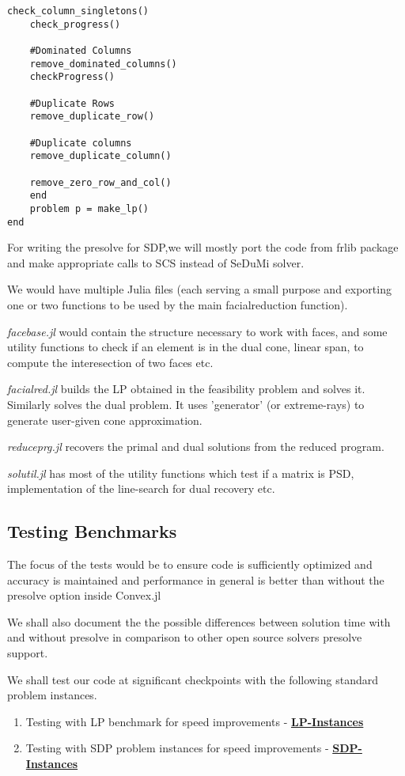 \documentclass[twoside]{article}
\begin{document}
\begin{multicols}{2}
\begin{Verbatim}[obeytabs]
	check_column_singletons()
	check_progress()

	#Dominated Columns
	remove_dominated_columns()
	checkProgress()

	#Duplicate Rows
	remove_duplicate_row()
	
	#Duplicate columns
	remove_duplicate_column()
	
	remove_zero_row_and_col()
	end
	problem p = make_lp()
end
\end{Verbatim}

For writing the presolve for SDP,we will mostly port the code from frlib package and make appropriate calls to SCS instead of SeDuMi solver.

We would have multiple Julia files (each serving a small purpose and exporting one or two functions to be used by the main facialreduction function).

\textit{facebase.jl} would contain the structure necessary to work with faces, and some utility functions to check if an element is in the dual cone, linear span, to compute the interesection of two faces etc.

\textit{facialred.jl} builds the LP obtained in the feasibility problem and solves it. Similarly solves the dual problem. It uses 'generator' (or extreme-rays) to generate user-given cone approximation. 

\textit{reduceprg.jl} recovers the primal and dual solutions from the reduced program. 

\textit{solutil.jl} has most of the utility functions which test if a matrix is PSD, implementation of the line-search for dual recovery etc. 


\vspace*{-\baselineskip}

\subsection{\textbf{Testing Benchmarks}}
The focus of the tests would be to ensure code is sufficiently optimized and accuracy is maintained and performance in general is better than without the presolve option inside Convex.jl

We shall also document the the possible differences between solution time with and without presolve in comparison to other open source solvers presolve support. 

We shall test our code at significant checkpoints with the following standard problem instances. 

\begin{enumerate}
    \item Testing with LP benchmark for speed improvements - \href{http://www.cuter.rl.ac.uk/Problems/netlib.shtml}{\textbf{LP-Instances}}
    \item Testing with SDP problem instances for speed improvements - \href{http://www.math.uwaterloo.ca/~hwolkowi//henry/reports/SDPinstances.tar}{\textbf{SDP-Instances}}
\end{enumerate}
\vspace*{-\baselineskip}


\end{multicols}
\end{document}
